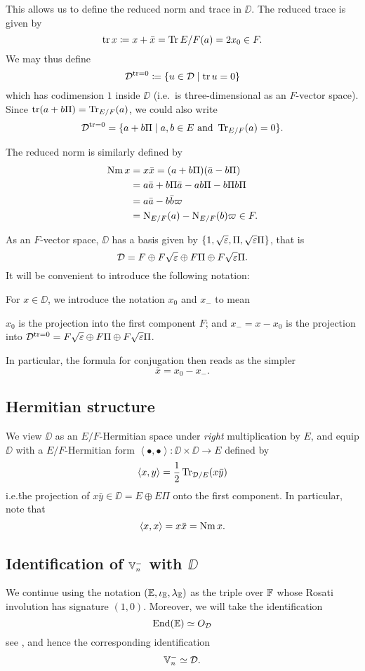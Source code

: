 This allows us to define the reduced norm and trace in $\DD$.
The reduced trace is given by
\[ \operatorname{tr} x \coloneqq x + \bar x = \operatorname{Tr}{E/F}(a) = 2x_0 \in F. \]
We may thus define
\[ \mathcal D^{\operatorname{tr} = 0} \coloneqq \left\{ u \in \mathcal D \mid \operatorname{tr} u = 0 \right\} \]
which has codimension $1$ inside $\DD$ (i.e.\ is three-dimensional as an $F$-vector space).
Since $\operatorname{tr}(a+b\Pi) = \operatorname{Tr}_{E/F}(a)$, we could also write
\[ \mathcal D^{\operatorname{tr} = 0} = \{ a+b\Pi \mid a,b \in E \text{ and } \operatorname{Tr}_{E/F}(a) = 0 \}. \]

The reduced norm is similarly defined by
\begin{align*}
  \operatorname{Nm} x &= x \bar x = (a + b \Pi)(\bar a - b \Pi) \\
  &= a \bar a + b \Pi \bar a - a b \Pi - b \Pi b \Pi \\
  &= a \bar a - b \bar b \varpi \\
  &= \operatorname{N}_{E/F}(a) - \operatorname{N}_{E/F}(b) \varpi \in F.
\end{align*}

As an $F$-vector space, $\DD$ has a basis given by
$\{1, \sqrt{\varepsilon}, \Pi, \sqrt{\varepsilon}\Pi\}$, that is
\[ \mathcal D = F \oplus F\sqrt{\varepsilon} \oplus F \Pi \oplus F\sqrt{\varepsilon}\Pi. \]
It will be convenient to introduce the following notation:
\begin{definition}
  For $x \in \DD$, we introduce the notation $x_0$ and $x_-$ to mean
  \begin{itemize}
    \ii $x_0$ is the projection into the first component $F$; and
    \ii $x_- = x - x_0$ is the projection into
    $\mathcal D^{\operatorname{tr} = 0} = F\sqrt{\varepsilon} \oplus F \Pi \oplus F\sqrt{\varepsilon}\Pi$.
  \end{itemize}
\end{definition}
In particular, the formula for conjugation then reads as the simpler
\[ \bar x = x_0 - x_-. \]

\subsection{Hermitian structure}
We view $\DD$ as an $E/F$-Hermitian space under \emph{right} multiplication by $E$,
and equip $\DD$ with a $E/F$-Hermitian form
$\left\langle \bullet, \bullet \right\rangle \colon \DD \times \DD \to E$
defined by
\[ \left\langle x,y \right\rangle = \frac{1}{2} \operatorname{Tr}_{\mathcal D/E}(x\bar y) \]
i.e.\. the projection of $x\bar y \in \DD = E \oplus E\Pi$ onto the first component.
In particular, note that
\[ \left\langle x,x \right\rangle  = x \bar x = \operatorname{Nm} x. \]

\subsection{Identification of $\mathbb V_n^-$ with $\DD$}
We continue using the notation $(\mathbb E, \iota_\mathbb E, \lambda_\mathbb E)$ as the triple over $\mathbb F$
whose Rosati involution has signature $(1,0)$.
Moreover, we will take the identification
\[ \operatorname{End}(\mathbb E) \simeq O_\mathcal D \]
see \cite[Remark 2.5]{ref:KR},
and hence the corresponding identification
\[ \mathbb V_n^- \simeq \mathcal D. \]


